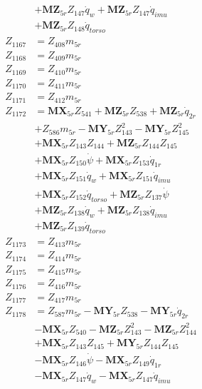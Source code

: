 \begin{multicols}{2}
\begin{align}
&+ \mathbf{MZ}_{5r}Z_{147}\dot{q}_{w} + \mathbf{MZ}_{5r}Z_{147}\dot{q}_{imu}  \nonumber \\
&+ \mathbf{MZ}_{5r}Z_{148}\dot{q}_{torso} \nonumber \\
Z_{1167} &= Z_{408}m_{5r} \nonumber \\
Z_{1168} &= Z_{409}m_{5r} \nonumber \\
Z_{1169} &= Z_{410}m_{5r} \nonumber \\
Z_{1170} &= Z_{411}m_{5r} \nonumber \\
Z_{1171} &= Z_{412}m_{5r} \nonumber \\
Z_{1172} &= \mathbf{MX}_{5r}Z_{541} + \mathbf{MZ}_{5r}Z_{538} + \mathbf{MZ}_{5r}\dot{q}_{2r}  \nonumber \\
&+ Z_{586}m_{5r} - \mathbf{MY}_{5r}Z_{143}^2 - \mathbf{MY}_{5r}Z_{145}^2  \nonumber \\
&+ \mathbf{MX}_{5r}Z_{143}Z_{144} + \mathbf{MZ}_{5r}Z_{144}Z_{145}  \nonumber \\
&+ \mathbf{MX}_{5r}Z_{150}\dot{\psi} + \mathbf{MX}_{5r}Z_{153}\dot{q}_{1r}  \nonumber \\
&+ \mathbf{MX}_{5r}Z_{151}\dot{q}_{w} + \mathbf{MX}_{5r}Z_{151}\dot{q}_{imu}  \nonumber \\
&+ \mathbf{MX}_{5r}Z_{152}\dot{q}_{torso} + \mathbf{MZ}_{5r}Z_{137}\dot{\psi}  \nonumber \\
&+ \mathbf{MZ}_{5r}Z_{138}\dot{q}_{w} + \mathbf{MZ}_{5r}Z_{138}\dot{q}_{imu}  \nonumber \\
&+ \mathbf{MZ}_{5r}Z_{139}\dot{q}_{torso} \nonumber \\
Z_{1173} &= Z_{413}m_{5r} \nonumber \\
Z_{1174} &= Z_{414}m_{5r} \nonumber \\
Z_{1175} &= Z_{415}m_{5r} \nonumber \\
Z_{1176} &= Z_{416}m_{5r} \nonumber \\
Z_{1177} &= Z_{417}m_{5r} \nonumber \\
Z_{1178} &= Z_{587}m_{5r} - \mathbf{MY}_{5r}Z_{538} - \mathbf{MY}_{5r}\dot{q}_{2r}  \nonumber \\
&- \mathbf{MX}_{5r}Z_{540} - \mathbf{MZ}_{5r}Z_{143}^2 - \mathbf{MZ}_{5r}Z_{144}^2  \nonumber \\
&+ \mathbf{MX}_{5r}Z_{143}Z_{145} + \mathbf{MY}_{5r}Z_{144}Z_{145}  \nonumber \\
&- \mathbf{MX}_{5r}Z_{146}\dot{\psi} - \mathbf{MX}_{5r}Z_{149}\dot{q}_{1r}  \nonumber \\
&- \mathbf{MX}_{5r}Z_{147}\dot{q}_{w} - \mathbf{MX}_{5r}Z_{147}\dot{q}_{imu}  \nonumber \\

\end{align}
\end{multicols}
